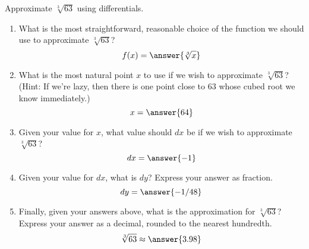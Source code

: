 \documentclass{ximera}
\author{Gregory Hartman \and Matthew Carr}
\begin{document}
\begin{exercise}




Approximate $\sqrt[3]{63}$ using differentials.
\begin{enumerate}
\item		What is the most straightforward, reasonable choice of the function we should use to approximate $\sqrt[3]{63}$?\[f(x)=\answer{\sqrt[3]{x}}\]
\item		What is the most natural point $x$ to use if we wish to approximate $\sqrt[3]{63}$? (Hint: If we're lazy, then there is one point close to $63$ whose cubed root we know immediately.) \[x=\answer{64}\]
\item		Given your value for $x$, what value should $dx$ be if we wish to approximate $\sqrt[3]{63}$? \[dx=\answer{-1}\]
\item		Given your value for $dx$, what is $dy$? Express your answer as fraction. \[dy=\answer{-1/48}\]
\item		Finally, given your answers above, what is the approximation for $\sqrt[3]{63}$? Express your answer as a decimal, rounded to the nearest hundredth. \[\sqrt[3]{63}\approx\answer{3.98}\]
\end{enumerate}


\end{exercise}
\end{document}
